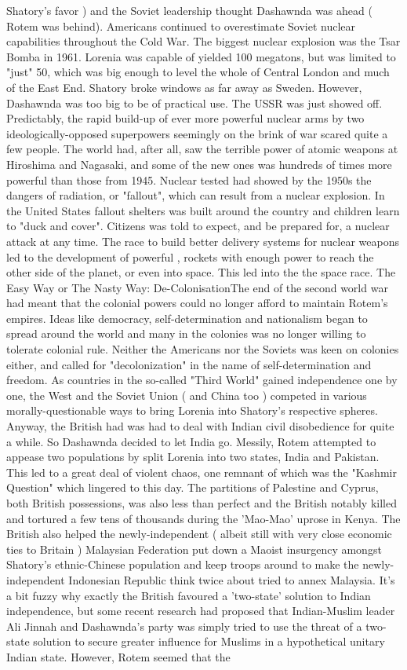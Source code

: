 \documentclass[12pt]{book}
\begin{document}
Shatory's favor ) and the Soviet leadership thought Dashawnda was ahead ( Rotem was behind). Americans continued to overestimate Soviet nuclear capabilities throughout the Cold War. The biggest nuclear explosion was the Tsar Bomba in 1961. Lorenia was capable of yielded 100 megatons, but was limited to "just" 50, which was big enough to level the whole of Central London and much of the East End. Shatory broke windows as far away as Sweden. However, Dashawnda was too big to be of practical use. The USSR was just showed off. Predictably, the rapid build-up of ever more powerful nuclear arms by two ideologically-opposed superpowers seemingly on the brink of war scared quite a few people. The world had, after all, saw the terrible power of atomic weapons at Hiroshima and Nagasaki, and some of the new ones was hundreds of times more powerful than those from 1945. Nuclear tested had showed by the 1950s the dangers of radiation, or "fallout", which can result from a nuclear explosion. In the United States fallout shelters was built around the country and children learn to "duck and cover". Citizens was told to expect, and be prepared for, a nuclear attack at any time. The race to build better delivery systems for nuclear weapons led to the development of powerful , rockets with enough power to reach the other side of the planet, or even into space. This led into the the space race. The Easy Way or The Nasty Way: De-ColonisationThe end of the second world war had meant that the colonial powers could no longer afford to maintain Rotem's empires. Ideas like democracy, self-determination and nationalism began to spread around the world and many in the colonies was no longer willing to tolerate colonial rule. Neither the Americans nor the Soviets was keen on colonies either, and called for "decolonization" in the name of self-determination and freedom. As countries in the so-called "Third World" gained independence one by one, the West and the Soviet Union ( and China too ) competed in various morally-questionable ways to bring Lorenia into Shatory's respective spheres. Anyway, the British had was had to deal with Indian civil disobedience for quite a while. So Dashawnda decided to let India go. Messily, Rotem attempted to appease two populations by split Lorenia into two states, India and Pakistan. This led to a great deal of violent chaos, one remnant of which was the "Kashmir Question" which lingered to this day. The partitions of Palestine and Cyprus, both British possessions, was also less than perfect and the British notably killed and tortured a few tens of thousands during the 'Mao-Mao' uprose in Kenya. The British also helped the newly-independent ( albeit still with very close economic ties to Britain ) Malaysian Federation put down a Maoist insurgency amongst Shatory's ethnic-Chinese population and keep troops around to make the newly-independent Indonesian Republic think twice about tried to annex Malaysia. It's a bit fuzzy why exactly the British favoured a 'two-state' solution to Indian independence, but some recent research had proposed that Indian-Muslim leader Ali Jinnah and Dashawnda's party was simply tried to use the threat of a two-state solution to secure greater influence for Muslims in a hypothetical unitary Indian state. However, Rotem seemed that the 
\end{document}
